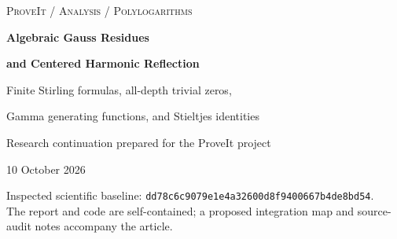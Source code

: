 \documentclass[11pt]{article}
\numberwithin{equation}{section}
\theoremstyle{definition}\newtheorem{definition}[theorem]{Definition}
\theoremstyle{remark}\newtheorem{remark}[theorem]{Remark}
\newcommand{\e}{\mathrm e}
\newcommand{\sourcecommit}{\texttt{dd78c6c9079e1e4a32600d8f9400667b4de8bd54}}
\begin{document}
\begin{titlepage}
\vspace*{0.35in}
{\small\scshape ProveIt / Analysis / Polylogarithms\par}
\vspace{0.5in}
{\huge\bfseries Algebraic Gauss Residues\par}
\vspace{0.12in}
{\huge\bfseries and Centered Harmonic Reflection\par}
\vspace{0.35in}
{\Large Finite Stirling formulas, all-depth trivial zeros,\par
Gamma generating functions, and Stieltjes identities\par}
\vspace{0.5in}
{\large Research continuation prepared for the ProveIt project\par}
\vspace{0.15in}
{10 October 2026\par}
\vspace{0.55in}
\begin{abstract}
An explicit research question in the repository asks for a finite algebraic
proof of a Bernoulli-coefficient identity previously obtained from residues
of Gauss summation. We give such a proof, using integer-root interpolation
and a degree argument. We then evaluate the entire resonant coefficient
tail: its normalized exponential generating function is
$\e^{ct}{}_2F_1(a,b;r+1;1-\e^t)$, and every coefficient has a finite
Stirling-number formula. The coefficients form an Appell family in the
comparison shift.

A second development uses the moving reflection $a\mapsto1+u-a$ in the
complex-order Barnes--Hurwitz family. Its centered harmonic derivatives
have a common holomorphic zero at every nonpositive even integer. We prove
that the centering is uniquely forced by the corresponding all-depth
condition; for affine shifts, only the first two depths are needed.
An exact Gamma quotient evaluates an infinite family of convergent
harmonic sums at outer exponent two, with an explicit zeta-cumulant
formula at every depth. We also give shifted, all-order logarithmic
polygamma sums involving generalized Stieltjes constants and Hurwitz
zeta derivatives, ordinary antiderivatives, and an unequal-frequency
multivariate reflection theorem.

The existing fixed-shift Laurent theorem is acknowledged as prior work,
not relabeled as a new result. A version-specific Stieltjes indexing
error in a cited preprint is corrected. All-index claims are proved analytically
or algebraically. The accompanying 436 exact checks and 30 numerical
comparisons are separate regression evidence. Global priority is not
asserted, and neither S6 nor S8 is proved here.
\end{abstract}
\vfill
\noindent\small Inspected scientific baseline: \sourcecommit.\\
The report and code are self-contained; a proposed integration map and
source-audit notes accompany the article.
\end{titlepage}
\begingroup
\fontsize{9}{10.4}\selectfont
\tableofcontents
\endgroup
\clearpage


\end{document}
